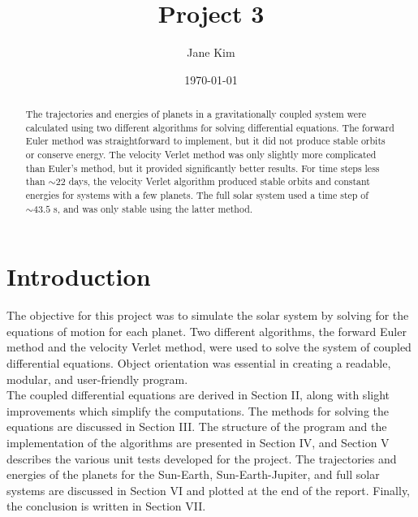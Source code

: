 \documentclass[prb,aps,twocolumn,showpacs,10pt]{revtex4-1}
\begin{document}
\title {Project 3}

\author{Jane Kim}
\date{\today}


\begin{abstract}
\vspace*{5mm}
The trajectories and energies of planets in a gravitationally coupled system were calculated using two different algorithms for solving differential equations. The forward Euler method was straightforward to implement, but it did not produce stable orbits or conserve energy. The velocity Verlet method was only slightly more complicated than Euler's method, but it provided significantly better results. For time steps less than $\sim 22$ days, the velocity Verlet algorithm produced stable orbits and constant energies for systems with a few planets. The full solar system used a time step of $\sim 43.5$ s, and was only stable using the latter method. 
\end{abstract}

\maketitle

\section{Introduction}

The objective for this project was to simulate the solar system by solving for the equations of motion for each planet. Two different algorithms, the forward Euler method and the velocity Verlet method, were used to solve the system of coupled differential equations. Object orientation was essential in creating a readable, modular, and user-friendly program. \\

The coupled differential equations are derived in Section II, along with slight improvements which simplify the computations. The methods for solving the equations are discussed in Section III. The structure of the program and the implementation of the algorithms are presented in Section IV, and Section V describes the various unit tests developed for the project. The trajectories and energies of the planets for the Sun-Earth, Sun-Earth-Jupiter, and full solar systems are discussed in Section VI and plotted at the end of the report. Finally, the conclusion is written in Section VII. \\
\end{document}
